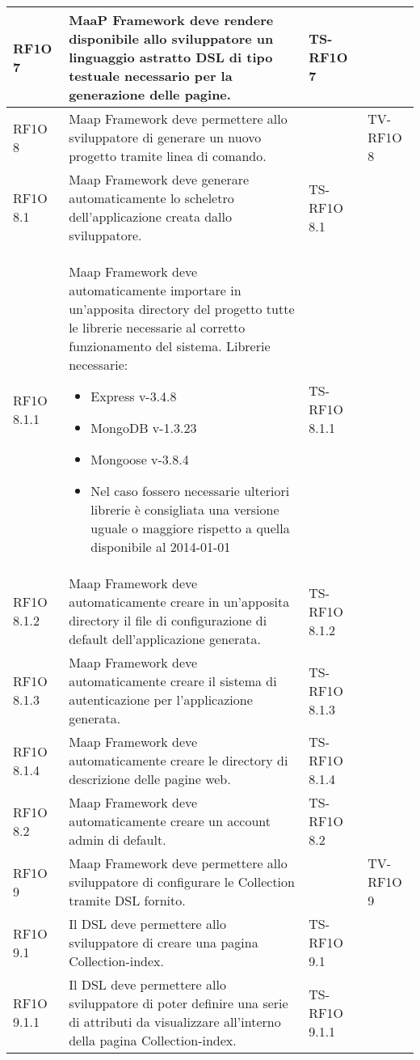 \begin{center}
\begin{longtable}{| p{2cm} | p{6cm} | p{2.5cm} | p{2.5cm} | }
					RF1O 7 & 
					MaaP Framework deve rendere disponibile allo sviluppatore un linguaggio astratto DSL di tipo testuale necessario per la generazione delle pagine. & TS-RF1O 7 & \\ \hline 
					RF1O 8 & 
					Maap Framework deve permettere allo sviluppatore di generare un nuovo progetto tramite linea di comando. &  & TV-RF1O 8 \\ \hline 
					RF1O 8.1  & 
					Maap Framework deve generare automaticamente lo scheletro dell’applicazione creata dallo sviluppatore. & TS-RF1O 8.1  & \\ \hline 
					RF1O 8.1.1 & 
					Maap Framework deve automaticamente importare in un'apposita directory del progetto tutte le librerie necessarie al corretto funzionamento del sistema. Librerie necessarie: \begin{itemize} \item Express v-3.4.8 \item MongoDB v-1.3.23 \item Mongoose v-3.8.4 \item Nel caso fossero necessarie ulteriori librerie è consigliata una versione uguale o maggiore rispetto a quella disponibile al 2014-01-01 \end{itemize} & TS-RF1O 8.1.1 & \\ \hline 
					RF1O 8.1.2 & 
					Maap Framework deve automaticamente creare in un’apposita directory il file di configurazione di default dell’applicazione generata. & TS-RF1O 8.1.2 & \\ \hline 
					RF1O 8.1.3 & 
					Maap Framework deve automaticamente creare il sistema di autenticazione per l’applicazione generata. & TS-RF1O 8.1.3 & \\ \hline 
					RF1O 8.1.4 & 
					Maap Framework deve automaticamente creare le directory di descrizione delle pagine web. & TS-RF1O 8.1.4 & \\ \hline 
					RF1O 8.2 & 
					Maap Framework deve automaticamente creare un account admin di default. & TS-RF1O 8.2 & \\ \hline 
					RF1O 9 & 
					Maap Framework deve permettere allo sviluppatore di configurare le Collection tramite DSL fornito. &  & TV-RF1O 9 \\ \hline 
					RF1O 9.1 & 
					Il DSL deve permettere allo sviluppatore di creare una pagina Collection-index. & TS-RF1O 9.1 & \\ \hline 
					RF1O 9.1.1 & 
					Il DSL deve permettere allo sviluppatore di poter definire una serie di attributi da visualizzare all’interno della pagina Collection-index. & TS-RF1O 9.1.1 & \\ \hline 

\end{longtable}
\end{center}
